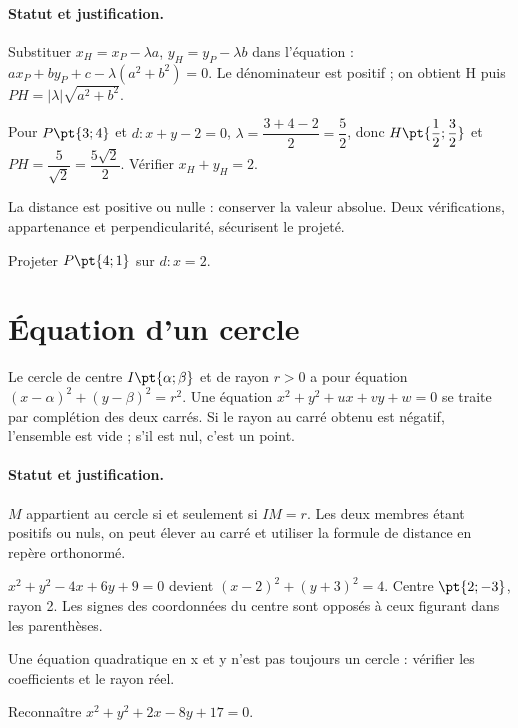 \paragraph{Statut et justification.} Substituer $x_H=x_P-\lambda a$, $y_H=y_P-\lambda b$ dans l’équation : $ax_P+by_P+c-\lambda(a^2+b^2)=0$. Le dénominateur est positif ; on obtient H puis $PH=|\lambda|\sqrt{a^2+b^2}$.
\begin{example}Pour $P\pt{3;4}$ et $d:x+y-2=0$, $\lambda =\dfrac{3+4-2}{2}=\dfrac{5}{2}$, donc $H\pt{\dfrac{1}{2};\dfrac{3}{2}}$ et $PH=\dfrac{5}{\sqrt 2}=\dfrac{5\sqrt 2}{2}$. Vérifier $x_H+y_H=2$.\end{example}\label{C07-EX2}
\begin{pitfall}La distance est positive ou nulle : conserver la valeur absolue. Deux vérifications, appartenance et perpendicularité, sécurisent le projeté.\end{pitfall}
\begin{application}Projeter $P\pt{4;1}$ sur $d:x=2$.\end{application}\label{C07-AP2}
\section{Équation d’un cercle}\label{C07-U3}
\begin{keypoint}
Le cercle de centre $I\pt{\alpha;\beta}$ et de rayon $r>0$ a pour équation $(x-\alpha)^2+(y-\beta)^2=r^2$. Une équation $x^2+y^2+ux+vy+w=0$ se traite par complétion des deux carrés. Si le rayon au carré obtenu est négatif, l’ensemble est vide ; s’il est nul, c’est un point.
\end{keypoint}
\paragraph{Statut et justification.} $M$ appartient au cercle si et seulement si $IM=r$. Les deux membres étant positifs ou nuls, on peut élever au carré et utiliser la formule de distance en repère orthonormé.
\begin{example}$x^2+y^2-4x+6y+9=0$ devient $(x-2)^2+(y+3)^2=4$. Centre $\pt{2;-3}$, rayon 2. Les signes des coordonnées du centre sont opposés à ceux figurant dans les parenthèses.\end{example}\label{C07-EX3}
\begin{pitfall}Une équation quadratique en x et y n’est pas toujours un cercle : vérifier les coefficients et le rayon réel.\end{pitfall}
\begin{application}Reconnaître $x^2+y^2+2x-8y+17=0$.\end{application}\label{C07-AP3}

